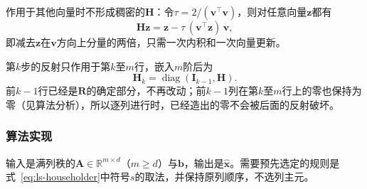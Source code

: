 作用于其他向量时不形成稠密的$\bm H$：令$\tau=2/(\bm v^\top\bm v)$，则对任意向量$\bm z$都有
\begin{equation}
 \bm H\bm z=\bm z-\tau\,(\bm v^\top\bm z)\,\bm v ,
 \label{eq:ls-householder-apply}
\end{equation}
即减去$\bm z$在$\bm v$方向上分量的两倍，只需一次内积和一次向量更新。

第$k$步的反射只作用于第$k$至$m$行，嵌入$m$阶后为
\begin{equation}
 \bm H_k=\operatorname{diag}(\bm I_{k-1},\bm H) .
 \label{eq:ls-householder-embedding}
\end{equation}
前$k-1$行已经是$\bm R$的确定部分，不再改动；前$k-1$列在第$k$至$m$行上的零也保持为零（见算法分析），所以逐列进行时，已经造出的零不会被后面的反射破坏。

\subsubsection{算法实现}
输入是满列秩的$\bm A\in\mathbb R^{m\times d}$（$m\geq d$）与$\bm b$，输出是$\hat{\bm x}$。需要预先选定的规则是式~\eqref{eq:ls-householder}中符号$s$的取法，并保持原列顺序，不选列主元。

